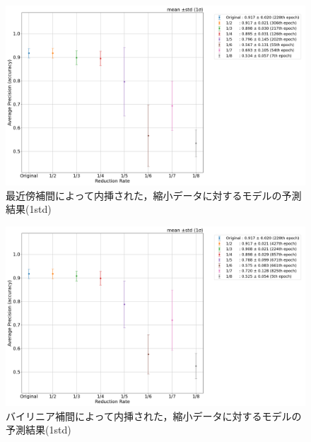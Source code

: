 \documentclass[a4j, 11pt]{jreport}
\begin{document}
\begin{figure}[H]
 \centering
 \includegraphics[width=16cm]{images/5syou/print_errorbar/nearest/acc_with_errorbar_syuron5_nearest_900epoch_30run_300_acc_max_std1sigma.png}
 \caption{最近傍補間によって内挿された，縮小データに対するモデルの予測結果(1std)}
 \label{fig:nearest_300_1std}
\end{figure}

\begin{figure}[H]
  \centering
  \includegraphics[width=16cm]{images/5syou/print_errorbar/linear/acc_with_errorbar_syuron5_linear_900epoch_30run_300_acc_max_std1sigma.png}
  \caption{バイリニア補間によって内挿された，縮小データに対するモデルの予測結果(1std)}
  \label{fig:linear_300_1std}
\end{figure}
\end{document}
